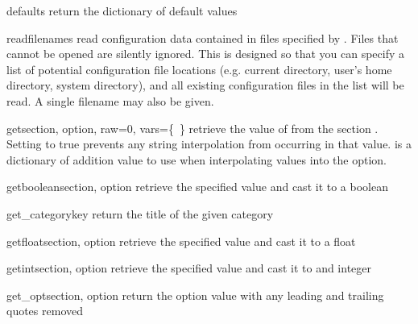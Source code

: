 \begin{methoddesc}[ConfigManager]{defaults}{}
return the dictionary of default values
\end{methoddesc}

\begin{methoddesc}[ConfigManager]{read}{filenames}
read configuration data contained in files specified by .
Files that cannot be opened are silently ignored.  This is designed so that
you can specify a list of potential configuration file locations (e.g.
current directory, user's home directory, system directory), and all 
existing configuration files in the list will be read.  A single filename
may also be given.
\end{methoddesc}

\begin{methoddesc}[ConfigManager]{get}{section, option, raw=0, vars=\{~\}}
retrieve the value of  from the section .
Setting  to true prevents any string interpolation from occurring
in that value.   is a dictionary of addition value to use 
when interpolating values into the option.

\end{methoddesc}

\begin{methoddesc}[ConfigManager]{getboolean}{section, option}
retrieve the specified value and cast it to a boolean
\end{methoddesc}

\begin{methoddesc}[ConfigManager]{get_category}{key}
return the title of the given category
\end{methoddesc}

\begin{methoddesc}[ConfigManager]{getfloat}{section, option}
retrieve the specified value and cast it to a float
\end{methoddesc}

\begin{methoddesc}[ConfigManager]{getint}{section, option}
retrieve the specified value and cast it to and integer
\end{methoddesc}

\begin{methoddesc}[ConfigManager]{get_opt}{section, option}
return the option value with any leading and trailing quotes removed
\end{methoddesc}


